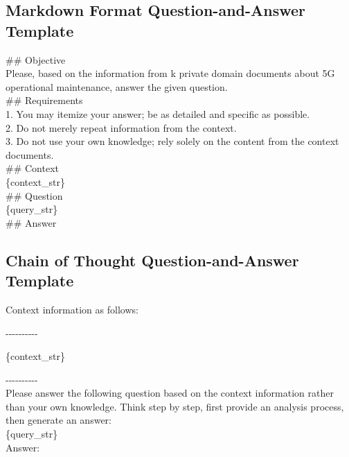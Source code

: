 \documentclass[11pt]{article}
\begin{document}
\subsection{Markdown Format Question-and-Answer Template}
\begin{tcolorbox}\label{sec:md_temp}
\#\# Objective\\

Please, based on the information from {k} private domain documents about 5G operational maintenance, answer the given question.\\

\#\# Requirements\\

1. You may itemize your answer; be as detailed and specific as possible.\\
2. Do not merely repeat information from the context.\\
3. Do not use your own knowledge; rely solely on the content from the context documents.\\

\#\# Context\\

\{{\color{blue}context\_str}\}\\

\#\# Question\\

\{{\color{blue}query\_str}\}\\

\#\# Answer\\
\end{tcolorbox}

\subsection{Chain of Thought Question-and-Answer Template}
\begin{tcolorbox}\label{sec:cot_temp}
Context information as follows:

-\--\--\--\--\--\--\--\--\--

\{{\color{blue}context\_str}\}

-\--\--\--\--\--\--\--\--\--\\

Please answer the following question based on the context information rather than your own knowledge. Think step by step, first provide an analysis process, then generate an answer:\\

\{{\color{blue}query\_str}\}\\

Answer:
\end{tcolorbox}
\end{document}
